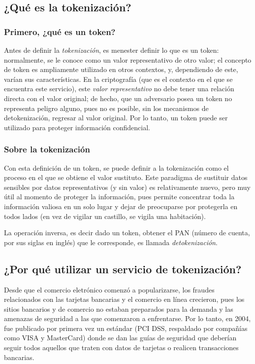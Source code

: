 
\subsection{¿Qué es la tokenización?}

\subsubsection{Primero, ¿qué es un token?}

Antes de definir la \textit{tokenización}, es menester definir lo que es
un token: normalmente, se le conoce como un valor representativo de otro
valor; el concepto de token es ampliamente utilizado en otros contextos,
y, dependiendo de este, varían sus características. En la criptografía
(que es el contexto en el que se encuentra este servicio), este
\textit{valor representativo} no debe tener una relación directa con el
valor original; de hecho, que un adversario posea un token no representa
peligro alguno, pues no es posible, sin los mecanismos de
detokenización, regresar al valor original. Por lo tanto, un token puede
ser utilizado para proteger información confidencial.

\subsubsection{Sobre la tokenización}

Con esta definición de un token, se puede definir a la tokenización como
el proceso en el que se obtiene el valor sustituto. Este paradigma de
sustituir datos sensibles por datos representativos (y sin valor) es
relativamente nuevo, pero muy útil al momento de proteger la
información, pues permite concentrar toda la información valiosa en un
solo lugar y dejar de preocuparse por protegerla en todos lados (en vez
de vigilar un castillo, se vigila una habitación).

La operación inversa, es decir dado un token, obtener el PAN (número de
cuenta, por sus siglas en inglés) que le corresponde, es llamada
\textit{detokenización}.

\subsection{¿Por qué utilizar un servicio de tokenización?}

Desde que el comercio eletrónico comenzó a popularizarse, los fraudes
relacionados con las tarjetas bancarias y el comercio en línea
crecieron, pues los sitios bancarios y de comercio no estaban
preparados para la demanda y las amenazas de seguridad a las que
comenzaron a enfrentarse. Por lo tanto, en 2004, fue publicado por
primera vez un estándar (PCI DSS, respaldado por compañías como VISA y
MasterCard) donde se dan las guías de seguridad que deberían seguir
todos aquellos que traten con datos de tarjetas o realicen transacciones
bancarias.

